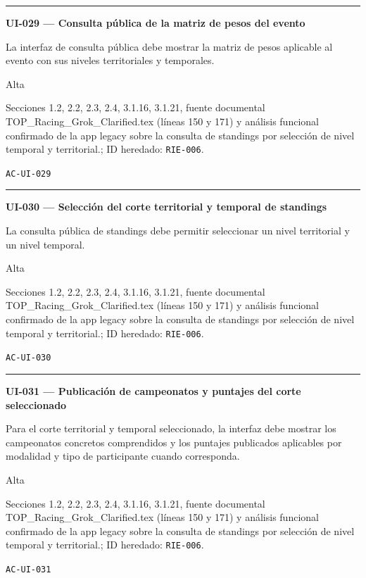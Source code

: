 \documentclass[10pt,letterpaper]{article}
\begin{document}
\vspace{0.25em}\hrule\vspace{0.65em}
\noindent\textbf{UI-029 --- Consulta pública de la matriz de pesos del evento}\par
\begin{description}[style=nextline,leftmargin=3.15cm,labelwidth=2.8cm,font=\normalfont\bfseries]
\item[Obligación] La interfaz de consulta pública debe mostrar la matriz de pesos aplicable al evento con sus niveles territoriales y temporales.
\item[Prioridad] Alta
\item[Procedencia] Secciones 1.2, 2.2, 2.3, 2.4, 3.1.16, 3.1.21, fuente documental TOP\_Racing\_Grok\_Clarified.tex (líneas 150 y 171) y análisis funcional confirmado de la app legacy sobre la consulta de standings por selección de nivel temporal y territorial.; ID heredado: \texttt{RIE-006}.
\item[Verificación] \texttt{AC-UI-029}
\end{description}
\vspace{0.25em}\hrule\vspace{0.65em}
\noindent\textbf{UI-030 --- Selección del corte territorial y temporal de standings}\par
\begin{description}[style=nextline,leftmargin=3.15cm,labelwidth=2.8cm,font=\normalfont\bfseries]
\item[Obligación] La consulta pública de standings debe permitir seleccionar un nivel territorial y un nivel temporal.
\item[Prioridad] Alta
\item[Procedencia] Secciones 1.2, 2.2, 2.3, 2.4, 3.1.16, 3.1.21, fuente documental TOP\_Racing\_Grok\_Clarified.tex (líneas 150 y 171) y análisis funcional confirmado de la app legacy sobre la consulta de standings por selección de nivel temporal y territorial.; ID heredado: \texttt{RIE-006}.
\item[Verificación] \texttt{AC-UI-030}
\end{description}
\vspace{0.25em}\hrule\vspace{0.65em}
\noindent\textbf{UI-031 --- Publicación de campeonatos y puntajes del corte seleccionado}\par
\begin{description}[style=nextline,leftmargin=3.15cm,labelwidth=2.8cm,font=\normalfont\bfseries]
\item[Obligación] Para el corte territorial y temporal seleccionado, la interfaz debe mostrar los campeonatos concretos comprendidos y los puntajes publicados aplicables por modalidad y tipo de participante cuando corresponda.
\item[Prioridad] Alta
\item[Procedencia] Secciones 1.2, 2.2, 2.3, 2.4, 3.1.16, 3.1.21, fuente documental TOP\_Racing\_Grok\_Clarified.tex (líneas 150 y 171) y análisis funcional confirmado de la app legacy sobre la consulta de standings por selección de nivel temporal y territorial.; ID heredado: \texttt{RIE-006}.
\item[Verificación] \texttt{AC-UI-031}
\end{description}
\end{document}
